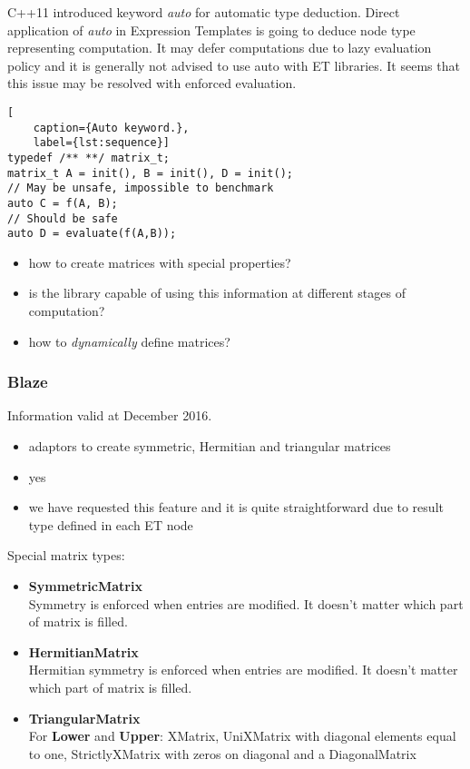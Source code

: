 \documentclass{article}
\begin{document}
C++11 introduced keyword \textit{auto} for automatic type deduction. Direct application of \textit{auto} in Expression Templates is going to deduce node type representing computation. It may defer computations due to lazy evaluation policy and it is generally not advised to use auto with ET libraries\cite{eigenAuto}. It seems that this issue may be resolved with enforced evaluation.

\begin{code}[h]
\begin{lstlisting}[
    caption={Auto keyword.},
    label={lst:sequence}]
typedef /** **/ matrix_t;
matrix_t A = init(), B = init(), D = init();
// May be unsafe, impossible to benchmark
auto C = f(A, B);
// Should be safe
auto D = evaluate(f(A,B));
\end{lstlisting}
\end{code}

\begin{itemize}
\item how to create matrices with special properties?
\item is the library capable of using this information at different stages of computation? 
\item how to \textit{dynamically} define matrices?
\end{itemize}

\subsubsection{Blaze}
Information valid at December 2016.
\begin{itemize}
\item adaptors to create symmetric, Hermitian and triangular matrices\cite{blazeAdaptors}
\item yes\cite{blazeEval}
\item we have requested this feature and it is quite straightforward due to result type defined in each ET node\cite{blazeEval}
\end{itemize}

Special matrix types:
\begin{itemize}
\item \textbf{SymmetricMatrix} \\
Symmetry is enforced when entries are modified. It doesn't matter which part of matrix is filled.
\item \textbf{HermitianMatrix} \\
Hermitian symmetry is enforced when entries are modified. It doesn't matter which part of matrix is filled.
\item \textbf{TriangularMatrix} \\
For \textbf{Lower} and \textbf{Upper}: XMatrix, UniXMatrix with diagonal elements equal to one, StrictlyXMatrix with zeros on diagonal and a DiagonalMatrix 
\end{itemize}
\end{document}
